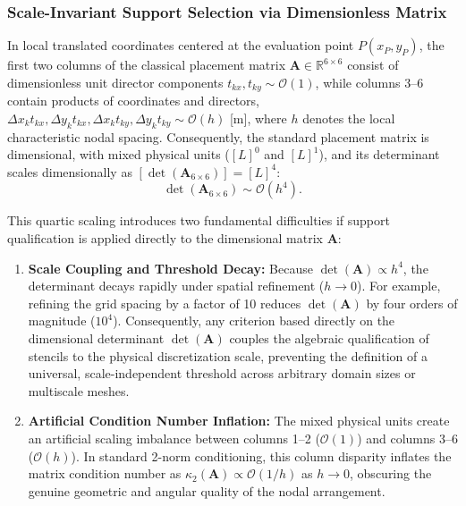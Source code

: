 \documentclass[preprint,12pt]{elsarticle}
\begin{document}
\subsubsection{Scale-Invariant Support Selection via Dimensionless Matrix}
\label{subsec:scale_invariant_criterion}

In local translated coordinates centered at the evaluation point $P(x_P, y_P)$, the first two columns of the classical placement matrix $\mathbf{A} \in \mathbb{R}^{6 \times 6}$ consist of dimensionless unit director components $t_{kx}, t_{ky} \sim \mathcal{O}(1)$, while columns 3--6 contain products of coordinates and directors, $\Delta x_k t_{kx}, \Delta y_k t_{kx}, \Delta x_k t_{ky}, \Delta y_k t_{ky} \sim \mathcal{O}(h)$ [m], where $h$ denotes the local characteristic nodal spacing. Consequently, the standard placement matrix is dimensional, with mixed physical units ($[L]^0$ and $[L]^1$), and its determinant scales dimensionally as $[\det(\mathbf{A}_{6\times6})] = [L]^4$:
\begin{equation}
\det(\mathbf{A}_{6\times6}) \sim \mathcal{O}(h^4).
\label{eq:det_quartic_scaling}
\end{equation}

This quartic scaling introduces two fundamental difficulties if support qualification is applied directly to the dimensional matrix $\mathbf{A}$:
\begin{enumerate}
    \item \textbf{Scale Coupling and Threshold Decay:} Because $\det(\mathbf{A}) \propto h^4$, the determinant decays rapidly under spatial refinement ($h \to 0$). For example, refining the grid spacing by a factor of 10 reduces $\det(\mathbf{A})$ by four orders of magnitude ($10^4$). Consequently, any criterion based directly on the dimensional determinant $\det(\mathbf{A})$ couples the algebraic qualification of stencils to the physical discretization scale, preventing the definition of a universal, scale-independent threshold across arbitrary domain sizes or multiscale meshes.
    \item \textbf{Artificial Condition Number Inflation:} The mixed physical units create an artificial scaling imbalance between columns 1--2 ($\mathcal{O}(1)$) and columns 3--6 ($\mathcal{O}(h)$). In standard 2-norm conditioning, this column disparity inflates the matrix condition number as $\kappa_2(\mathbf{A}) \propto \mathcal{O}(1/h)$ as $h \to 0$, obscuring the genuine geometric and angular quality of the nodal arrangement.
\end{enumerate}
\end{document}
